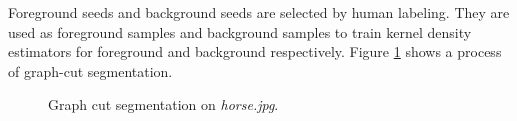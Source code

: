 \documentclass[paper=a4, fontsize=11pt]{scrartcl}
\begin{document}
Foreground seeds and background seeds are selected by human labeling.
They are used as foreground samples and background samples to train kernel density estimators for foreground and background respectively.
Figure \ref{fig:graph_cut:01} shows a process of graph-cut segmentation.

\begin{figure}[h]
\centering
{}
\caption{Graph cut segmentation on \emph{horse.jpg}.}
\label{fig:graph_cut:01}
\end{figure}
\end{document}
